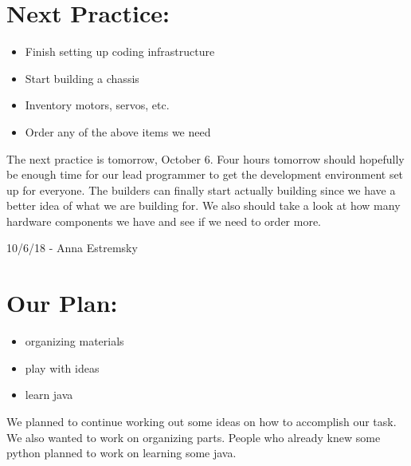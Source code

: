 \documentclass[12pt]{article}
\begin{document}
\section{Next Practice:}
\begin{itemize}
	\item Finish setting up coding infrastructure
	\item Start building a chassis
	\item Inventory motors, servos, etc.
	\item Order any of the above items we need
\end{itemize}

The next practice is tomorrow, October 6. %
Four hours tomorrow should hopefully be enough time for our lead programmer to get the development environment set up for everyone. The builders can finally start actually building since we have a better idea of what we are building for. We also should take a look at how many hardware components we have and see if we need to order more.

\newpage
\setcounter{section}{0}

10/6/18 - Anna Estremsky

\section{Our Plan:} %
\begin{itemize}
	\item organizing materials
	\item play with ideas
	\item learn java

\end{itemize}

We planned to continue working out some ideas on how to accomplish our task. We also wanted to work on organizing parts. People who already knew some python planned to work on learning some java. 
\end{document}
